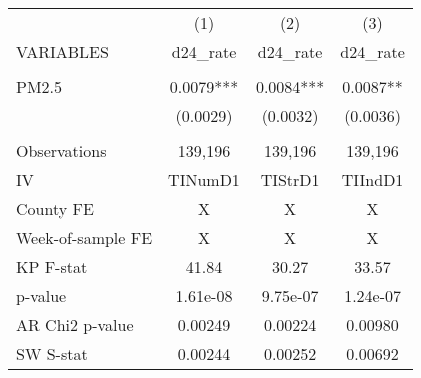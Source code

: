\begin{tabular}{lccc} \hline
 & (1) & (2) & (3) \\
VARIABLES & d24\_rate & d24\_rate & d24\_rate \\ \hline
 &  &  &  \\
PM2.5 & 0.0079*** & 0.0084*** & 0.0087** \\
 & (0.0029) & (0.0032) & (0.0036) \\
 &  &  &  \\
Observations & 139,196 & 139,196 & 139,196 \\
IV & TINumD1 & TIStrD1 & TIIndD1 \\
County FE & X & X & X \\
Week-of-sample FE & X & X & X \\
KP F-stat & 41.84 & 30.27 & 33.57 \\
p-value & 1.61e-08 & 9.75e-07 & 1.24e-07 \\
AR Chi2 p-value & 0.00249 & 0.00224 & 0.00980 \\
 SW S-stat & 0.00244 & 0.00252 & 0.00692 \\ \hline
\end{tabular}
